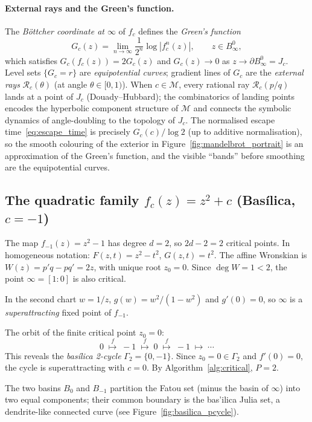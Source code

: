 \documentclass[12pt]{article}
\theoremstyle{definition}
\begin{document}
\paragraph{External rays and the Green's function.}
The \emph{B\"ottcher coordinate at $\infty$} of $f_c$ defines the
\emph{Green's function}
\[
  G_c(z) = \lim_{n\to\infty} \frac{1}{2^n}\log|f_c^n(z)|,
  \qquad z\in B^0_\infty,
\]
which satisfies $G_c(f_c(z))=2G_c(z)$ and $G_c(z)\to 0$ as
$z\to\partial B^0_\infty=J_c$.  Level sets $\{G_c=r\}$ are
\emph{equipotential curves}; gradient lines of $G_c$ are the
\emph{external rays} $\mathcal{R}_c(\theta)$ (at angle $\theta\in[0,1)$).
When $c\in\mathcal{M}$, every rational ray $\mathcal{R}_c(p/q)$ lands
at a point of $J_c$ (Douady--Hubbard); the combinatorics of landing
points encodes the hyperbolic component structure of $\mathcal{M}$ and
connects the symbolic dynamics of angle-doubling to the topology of
$J_c$.  The normalised escape time~\eqref{eq:escape_time} is precisely
$G_c(c)/\log 2$ (up to additive normalisation), so the smooth colouring
of the exterior in Figure~\ref{fig:mandelbrot_portrait} is an approximation
of the Green's function, and the visible ``bands'' before smoothing are
the equipotential curves.

\subsection{The quadratic family $f_c(z)=z^2+c$ (Bas\'ilica, $c=-1$)}
\label{subsec:basilica}

The map $f_{-1}(z)=z^2-1$ has degree $d=2$, so $2d-2=2$ critical points.
In homogeneous notation: $F(z,t) = z^2-t^2$, $G(z,t)=t^2$.
The affine Wronskian is $W(z)=p'q-pq'=2z$, with unique root $z_0=0$.
Since $\deg W=1<2$, the point $\infty=[1:0]$ is also critical.

In the second chart $w=1/z$, $g(w)=w^2/(1-w^2)$ and $g'(0)=0$, so
$\infty$ is a \emph{superattracting} fixed point of $f_{-1}$.

The orbit of the finite critical point $z_0=0$:
\[
  0\;\overset{f}{\longmapsto}\;-1\;\overset{f}{\longmapsto}\;0
  \;\overset{f}{\longmapsto}\;-1\;\longmapsto\;\cdots
\]
This reveals the \emph{bas\'ilica 2-cycle} $\Gamma_2=\{0,-1\}$.  Since
$z_0=0\in\Gamma_2$ and $f'(0)=0$, the cycle is superattracting with $c=0$.
By Algorithm~\ref{alg:critical}, $P=2$.

The two basins $B_0$ and $B_{-1}$ partition the Fatou set (minus the
basin of $\infty$) into two equal components; their common boundary is
the bas'ilica Julia set, a dendrite-like connected curve
(see Figure~\ref{fig:basilica_pcycle}).
\end{document}
